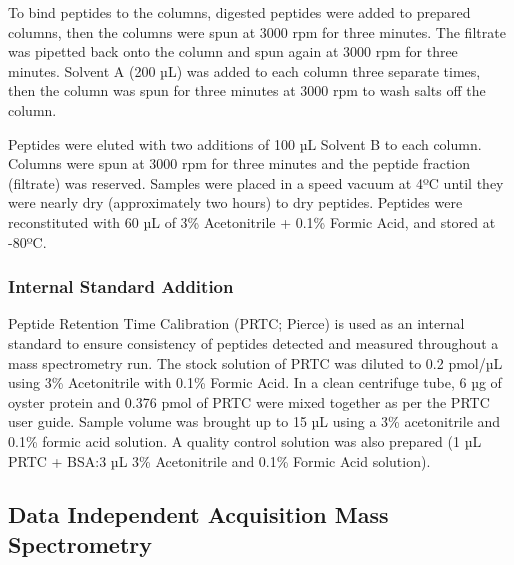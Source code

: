 \documentclass [11pt, proquest] {uwthesis}[2015/03/03]
\begin{document}
To bind peptides to the columns, digested peptides were added to prepared columns, then the columns were spun at 3000 rpm for three minutes. The filtrate was pipetted back onto the column and spun again at 3000 rpm for three minutes. Solvent A (200 µL) was added to each column three separate times, then the column was spun for three minutes at 3000 rpm to wash salts off the column.

Peptides were eluted with two additions of 100 µL Solvent B to each column. Columns were spun at 3000 rpm for three minutes and the peptide fraction (filtrate) was reserved. Samples were placed in a speed vacuum at 4ºC until they were nearly dry (approximately two hours) to dry peptides. Peptides were reconstituted with 60 µL of 3\% Acetonitrile + 0.1\% Formic Acid, and stored at -80ºC.

\hypertarget{internal-standard-addition}{%
\subsubsection{Internal Standard Addition}\label{internal-standard-addition}}

Peptide Retention Time Calibration (PRTC; Pierce) is used as an internal standard to ensure consistency of peptides detected and measured throughout a mass spectrometry run. The stock solution of PRTC was diluted to 0.2 pmol/µL using 3\% Acetonitrile with 0.1\% Formic Acid. In a clean centrifuge tube, 6 µg of oyster protein and 0.376 pmol of PRTC were mixed together as per the PRTC user guide. Sample volume was brought up to 15 µL using a 3\% acetonitrile and 0.1\% formic acid solution. A quality control solution was also prepared (1 µL PRTC + BSA:3 µL 3\% Acetonitrile and 0.1\% Formic Acid solution).

\hypertarget{data-independent-acquisition-mass-spectrometry}{%
\subsection{Data Independent Acquisition Mass Spectrometry}\label{data-independent-acquisition-mass-spectrometry}}
\end{document}
